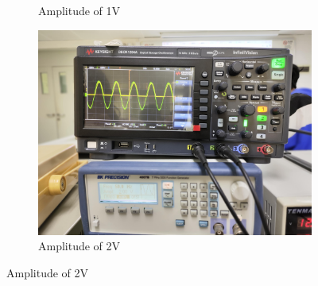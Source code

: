 \begin{itemize}
\begin{figure}[H]
\begin{subfigure}{0.3\textwidth}
                \caption{Amplitude of 1V}
                \label{l121wf2}
            \end{subfigure}
            \begin{subfigure}{0.3\textwidth}
                \centering
                \includegraphics[width=1\linewidth]{Experiment_12/Images/RetB 50-2-min.jpg}
                \caption{Amplitude of 2V}
                \label{l122wf2}
            \end{subfigure}


\end{figure}
\end{itemize}
